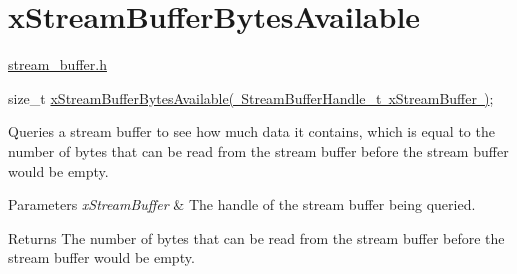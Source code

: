 \hypertarget{group__x_stream_buffer_bytes_available}{}\section{x\+Stream\+Buffer\+Bytes\+Available}
\label{group__x_stream_buffer_bytes_available}
\mbox{\hyperlink{stream__buffer_8h}{stream\+\_\+buffer.\+h}}


\begin{DoxyPre}
size\_t \mbox{\hyperlink{stream__buffer_8h_af32d1737de29f24ee31ac1e3c407d9fd}{xStreamBufferBytesAvailable( StreamBufferHandle\_t xStreamBuffer )}};
\end{DoxyPre}


Queries a stream buffer to see how much data it contains, which is equal to the number of bytes that can be read from the stream buffer before the stream buffer would be empty.


\begin{DoxyParams}{Parameters}
{\em x\+Stream\+Buffer} & The handle of the stream buffer being queried.\\
\hline
\end{DoxyParams}
\begin{DoxyReturn}{Returns}
The number of bytes that can be read from the stream buffer before the stream buffer would be empty. 
\end{DoxyReturn}
